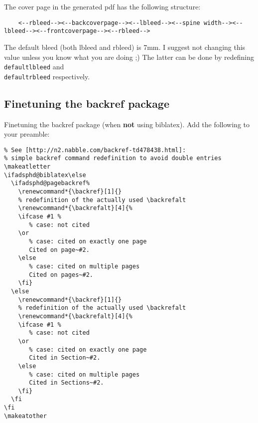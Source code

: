 The cover page in the generated pdf has the following structure:

{\tiny
\begin{verbatim}
    <--rbleed--><--backcoverpage--><--lbleed--><--spine width--><--lbleed--><--frontcoverpage--><--rbleed-->
\end{verbatim}
}

The default bleed (both lbleed and rbleed) is 7mm. I suggest not changing this
value unless you know what you are doing ;) The latter can be done by
redefining \texttt{\\defaultlbleed} and \texttt{\\defaultrbleed} respectively.


\subsection{Finetuning the backref package}

Finetuning the backref package (when \textbf{not} using biblatex). Add the
following to your preamble:

\begin{verbatim}
% See [http://n2.nabble.com/backref-td478438.html]:
% simple backref command redefinition to avoid double entries
\makeatletter
\ifadsphd@biblatex\else
  \ifadsphd@pagebackref%
    \renewcommand*{\backref}[1]{}
    % redefinition of the actually used \backrefalt 
    \renewcommand*{\backrefalt}[4]{% 
    \ifcase #1 % 
       % case: not cited 
    \or 
       % case: cited on exactly one page 
       Cited on page~#2.
    \else 
       % case: cited on multiple pages 
       Cited on pages~#2.
    \fi}
  \else
    \renewcommand*{\backref}[1]{}
    % redefinition of the actually used \backrefalt 
    \renewcommand*{\backrefalt}[4]{% 
    \ifcase #1 % 
       % case: not cited 
    \or 
       % case: cited on exactly one page 
       Cited in Section~#2.
    \else 
       % case: cited on multiple pages 
       Cited in Sections~#2.
    \fi}
  \fi
\fi
\makeatother
\end{verbatim}



\cleardoublepage

